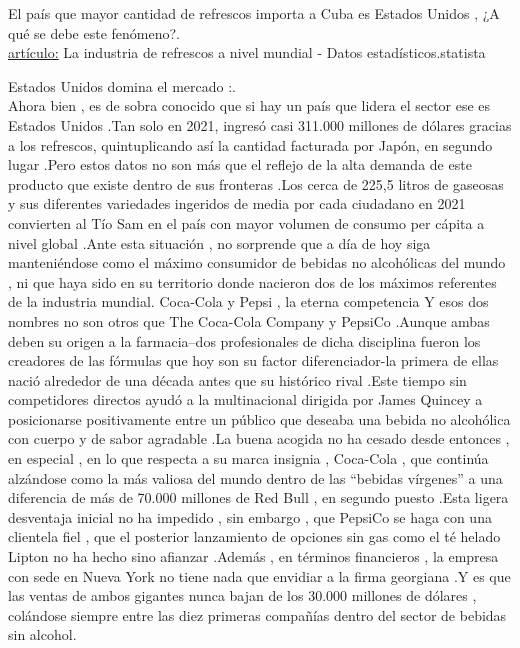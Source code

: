 \documentclass[twocolumn,12pt]{article}
\begin{document}
El país que mayor cantidad de refrescos importa a Cuba es Estados Unidos , ¿A qué se debe este fenómeno?.\\


\underline{artículo:} La industria de refrescos a nivel mundial - Datos estadísticos.statista

Estados Unidos domina el mercado :.\\

Ahora bien , es de sobra conocido que si hay un país que lidera el sector ese es Estados Unidos .Tan solo en 2021, ingresó casi 311.000 millones de dólares gracias a los refrescos, quintuplicando así la cantidad facturada por Japón, en segundo lugar .Pero estos datos no son más que el reflejo de la alta demanda de este producto que existe dentro de sus fronteras .Los cerca de 225,5 litros de gaseosas y sus diferentes variedades ingeridos de media por cada ciudadano en 2021 convierten al Tío Sam en el país con mayor volumen de consumo per cápita a nivel global .Ante esta situación , no sorprende que a día de hoy siga manteniéndose como el máximo consumidor de bebidas no alcohólicas del mundo , ni que haya sido en su territorio donde nacieron dos de los máximos referentes de la industria mundial.
Coca-Cola y Pepsi , la eterna competencia
Y esos dos nombres no son otros que The Coca-Cola Company y PepsiCo .Aunque ambas deben su origen a la farmacia–dos profesionales de dicha disciplina fueron los creadores de las fórmulas que hoy son su factor diferenciador-la primera de ellas nació alrededor de una década antes que su histórico rival .Este tiempo sin competidores directos ayudó a la multinacional dirigida por James Quincey a posicionarse positivamente entre un público que deseaba una bebida no alcohólica con cuerpo y de sabor agradable .La buena acogida no ha cesado desde entonces , en especial , en lo que respecta a su marca insignia , Coca-Cola , que continúa alzándose como la más valiosa del mundo dentro de las “bebidas vírgenes” a una diferencia de más de 70.000 millones de Red Bull , en segundo puesto .Esta ligera desventaja inicial no ha impedido , sin embargo , que PepsiCo se haga con una clientela fiel , que el posterior lanzamiento de opciones sin gas como el té helado Lipton no ha hecho sino afianzar .Además , en términos financieros , la empresa con sede en Nueva York no tiene nada que envidiar a la firma georgiana .Y es que las ventas de ambos gigantes nunca bajan de los 30.000 millones de dólares , colándose siempre entre las diez primeras compañías dentro del sector de bebidas sin alcohol. 
\end{document}
